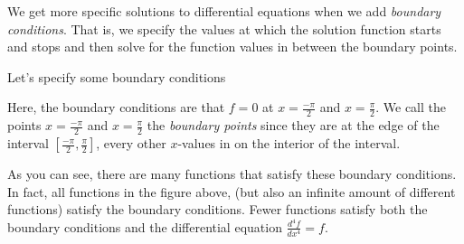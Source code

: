 \documentclass{ximera}
\begin{document}
We get more specific solutions to differential equations when we add \emph{boundary conditions}. That is, we specify the values at which the solution function starts and stops and then solve for the function values in between the boundary points. 

Let's specify some boundary conditions 


Here, the boundary conditions are that $f=0$ at $x=\frac{-\pi}{2}$ and $x=\frac{\pi}{2}$. We call the points $x=\frac{-\pi}{2}$ and $x=\frac{\pi}{2}$ the \emph{boundary points} since they are at the edge of the interval $[\frac{-\pi}{2},\frac{\pi}{2}]$, every other $x$-values in on the interior of the interval.

As you can see, there are many functions that satisfy these boundary conditions. In fact, all functions in the figure above, (but also an infinite amount of different functions) satisfy the boundary conditions. Fewer functions satisfy both the boundary conditions and the differential equation $\frac{d^4f}{dx^4} = f$.
\end{document}
